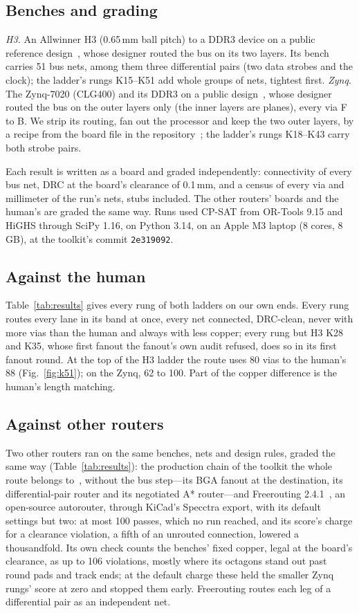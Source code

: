 \documentclass[journal]{IEEEtran}
\newcommand{\krtcommit}{2e319092}
\begin{document}
\subsection{Benches and grading}
\emph{H3.} An Allwinner H3 (0.65\,mm ball pitch) to a DDR3 device on a public reference design~\cite{h3board}, whose designer routed the bus on its two layers. Its bench carries 51 bus nets, among them three differential pairs (two data strobes and the clock); the ladder's rungs K15--K51 add whole groups of nets, tightest first.
\emph{Zynq.} The Zynq-7020 (CLG400) and its DDR3 on a public design~\cite{zynqboard}, whose designer routed the bus on the outer layers only (the inner layers are planes), every via F to B. We strip its routing, fan out the processor and keep the two outer layers, by a recipe from the board file in the repository~\cite{krt}; the ladder's rungs K18--K43 carry both strobe pairs.

Each result is written as a board and graded independently: connectivity of every bus net, DRC at the board's clearance of 0.1\,mm, and a census of every via and millimeter of the run's nets, stubs included. The other routers' boards and the human's are graded the same way. Runs used CP-SAT from OR-Tools 9.15 and HiGHS through SciPy 1.16, on Python 3.14, on an Apple M3 laptop (8 cores, 8\,GB), at the toolkit's commit \texttt{\krtcommit}.

\subsection{Against the human}
Table~\ref{tab:results} gives every rung of both ladders on our own ends. Every rung routes every lane in its band at once, every net connected, DRC-clean, never with more vias than the human and always with less copper; every rung but H3 K28 and K35, whose first fanout the fanout's own audit refused, does so in its first fanout round. At the top of the H3 ladder the route uses 80 vias to the human's 88 (Fig.~\ref{fig:k51}); on the Zynq, 62 to 100. Part of the copper difference is the human's length matching.

\subsection{Against other routers}
Two other routers ran on the same benches, nets and design rules, graded the same way (Table~\ref{tab:results}): the production chain of the toolkit the whole route belongs to~\cite{krt}, without the bus step---its BGA fanout at the destination, its differential-pair router and its negotiated A* router---and Freerouting 2.4.1~\cite{freerouting}, an open-source autorouter, through KiCad's Specctra export, with its default settings but two: at most 100 passes, which no run reached, and its score's charge for a clearance violation, a fifth of an unrouted connection, lowered a thousandfold. Its own check counts the benches' fixed copper, legal at the board's clearance, as up to 106 violations, mostly where its octagons stand out past round pads and track ends; at the default charge these held the smaller Zynq rungs' score at zero and stopped them early. Freerouting routes each leg of a differential pair as an independent net.
\end{document}
